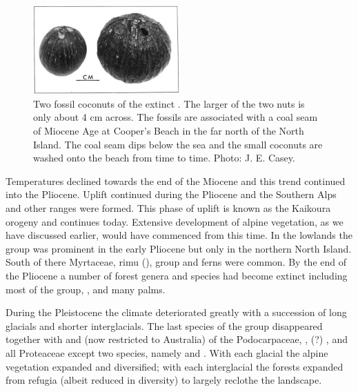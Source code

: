\begin{figure}
	\includegraphics[width=0.5\textwidth]{graphics/figure124fossil-coconuts.jpg}
	\centering
	\caption[Two fossil coconuts]{Two fossil coconuts of the extinct .
	The larger of the two nuts is only about 4 cm across.
	The fossils are associated with a coal seam of Miocene Age at Cooper's Beach in the far north of the North Island.
	The coal seam dips below the sea and the small coconuts are washed onto the beach from time to time.
	Photo: J. E. Casey.}%
	\label{fig:124fossil-coconuts}
\end{figure}

Temperatures declined towards the end of the Miocene and this trend continued into the Pliocene.
Uplift continued during the Pliocene and the Southern Alps and other ranges were formed.
This phase of uplift is known as the Kaikoura orogeny and continues today.
Extensive development of alpine vegetation, as we have discussed earlier, would have commenced from this time.
In the lowlands the  group was prominent in the early Pliocene but only in the northern North Island.
South of there Myrtaceae, rimu (),   group and ferns were common.
By the end of the Pliocene a number of forest genera and species had become extinct including most of the  group, ,  and many palms.

During the Pleistocene the climate deteriorated greatly with a succession of long glacials and shorter interglacials.
The last species of the  group disappeared together with  and  (now restricted to Australia) of the Podocarpaceae, , (?) ,  and all Proteaceae except two species, namely  and .
With each glacial the alpine vegetation expanded and diversified; with each interglacial the forests expanded from refugia (albeit reduced in diversity) to largely reclothe the landscape.

